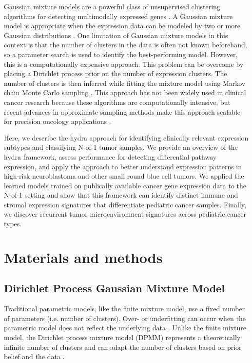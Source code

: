 \documentclass[10pt,letterpaper]{article}
\begin{document}
Gaussian mixture models are a powerful class of unsupervised clustering algorithms for detecting multimodally expressed genes \cite{ghoshMixtureModelsAssessing2004,dahlModelBasedClusteringExpression2006,kimVariableSelectionClustering2006}. A Gaussian mixture model is appropriate when the expression data can be modeled by two or more Gaussian distributions \cite{gelman2013bayesian}. One limitation of Gaussian mixture models in this context is that the number of clusters in the data is often not known beforehand, so a parameter search is used to identify the best-performing model. However, this is a computationally expensive approach. This problem can be overcome by placing a Dirichlet process prior on the number of expression clusters. The number of clusters is then inferred while fitting the mixture model using Markov chain Monte Carlo sampling \cite{gelman2013bayesian}. This approach has not been widely used in clinical cancer research because these algorithms are computationally intensive, but recent advances in approximate sampling methods make this approach scalable for precision oncology applications \cite{thallBayesianNonparametricStatistics2017}.

Here, we describe the hydra approach for identifying clinically relevant expression subtypes and classifying N-of-1 tumor samples. We provide an overview of the hydra framework, assess performance for detecting differential pathway expression, and apply the approach to better understand expression patterns in high-risk neuroblastoma and other small round blue cell tumors. We applied the learned models trained on publically available cancer gene expression data to the N-of-1 setting and show that this framework can identify distinct immune and stromal expression signatures that differentiate pediatric cancer samples. Finally, we discover recurrent tumor microenvironment signatures across pediatric cancer types.


\section*{Materials and methods}
\subsection{Dirichlet Process Gaussian Mixture Model}
Traditional parametric models, like the finite mixture model, use a fixed number of parameters (i.e. number of clusters). Over- or underfitting can occur when the parametric model does not reflect the underlying data \cite{teh2010dirichlet}. Unlike the finite mixture model, the Dirichlet process mixture model (DPMM) represents a theoretically infinite number of clusters and can adapt the number of clusters based on prior belief and the data \cite{gelmanBayesianDataAnalysis2013, antoniakMixturesDirichletProcesses1974}.
\end{document}
